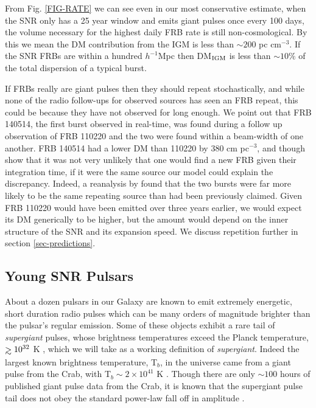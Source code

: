 \documentclass[useAMS,usenatbib]{mn2e}
\def\gtrsim{\mathrel{\hbox{\rlap{\hbox{\lower4pt\hbox{$\sim$}}}\hbox{$>$}}}}
\begin{document}
From Fig. \ref{FIG-RATE} we can see even in our most conservative estimate, when
the SNR only has a 25 year window and emits giant pulses once every
100 days, the volume necessary for the highest daily FRB rate is still non-cosmological.
By this we mean the DM contribution from the IGM is less than $\sim 200$ pc cm$^{-3}$.
If the SNR FRBs are within a hundred $h^{-1}$Mpc then DM$_{\rm IGM}$ is less than 
$\sim 10 \%$  of the total dispersion of a typical burst.

If FRBs really are giant pulses then they 
should repeat stochastically, and while none of the radio follow-ups for 
observed sources has seen an FRB repeat, this could be because they
have not observed for long enough. We point out that FRB 140514, 
the first burst observed in real-time, was found during a follow up observation
of FRB 110220 and the two were found within a beam-width of one another.
FRB 140514 had a lower DM than 110220 by 380 cm pc$^{-3}$, 
and though \cite{2014arXiv1412.0342P} show that it was not very unlikely that one would find a 
new FRB given their integration time, if it were the same source 
our model could explain the discrepancy. Indeed, a reanalysis by 
\cite{2015arXiv150701002M} found that the two bursts were far more likely
to be the same repeating source than had been previously claimed.
Given FRB 110220 would have been emitted over three years earlier, we 
would expect its DM generically to be higher, but the amount would 
depend on the inner structure of the SNR and its expansion speed. 
We discuss repetition further in section \ref{sec-predictions}.

\subsection{Young SNR Pulsars}

About a dozen pulsars in our Galaxy are known to emit extremely energetic,
short duration radio pulses which can be many orders of magnitude 
brighter than the pulsar's regular emission. Some of these objects exhibit 
a rare tail of \textit{supergiant} pulses, whose brightness temperatures 
exceed the Planck temperature, $\gtrsim10^{32}$ K \citep{2004ApJ...612..375C},
which we will take as a working definition of \textit{supergiant}. 
Indeed the largest
known brightness temperature, T$_{b}$, in the universe came from a giant pulse from the Crab,
 with T$_{b}\sim2\times10^{41}$ K \citep{2014ApJ...792..135T}. Though there
are only $\sim100$ hours of published giant pulse data from the Crab, it is known
that the supergiant pulse tail does not obey the standard power-law fall off
in amplitude \citep{2012ApJ...760...64M}.
\end{document}
